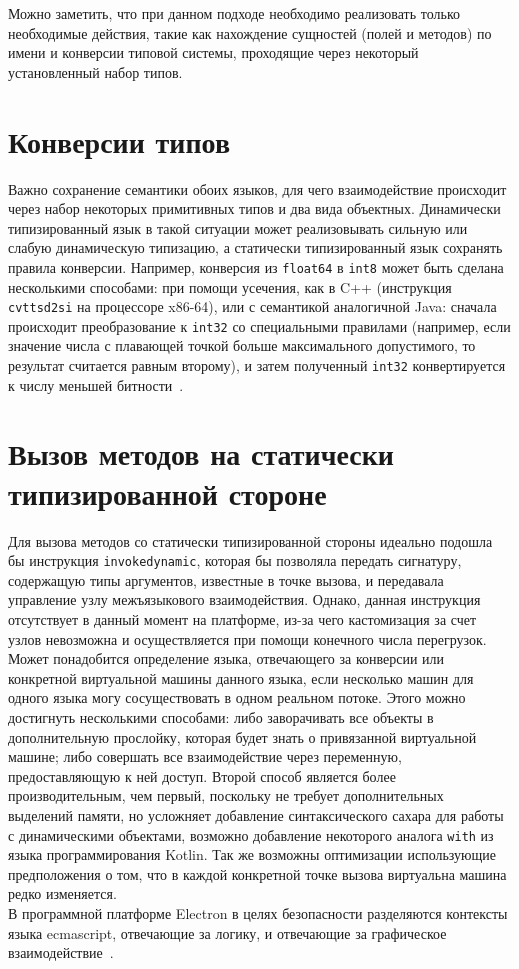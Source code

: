 \documentclass[times,specification,annotation]{itmo-student-thesis}
\begin{document}
Можно заметить, что при данном подходе необходимо реализовать только необходимые действия, такие как нахождение сущностей (полей и методов) по имени и конверсии типовой системы, проходящие через некоторый установленный набор типов.

\section{Конверсии типов}
Важно сохранение семантики обоих языков, для чего взаимодействие происходит через набор некоторых примитивных типов и два вида объектных. Динамически типизированный язык в такой ситуации может реализовывать сильную или слабую динамическую типизацию, а статически типизированный язык сохранять правила конверсии. Например, конверсия из \texttt{float64} в \texttt{int8} может быть сделана несколькими способами: при помощи усечения, как в C++ (инструкция \texttt{cvttsd2si} на процессоре x86-64), или с семантикой аналогичной Java: сначала происходит преобразование к \texttt{int32} со специальными правилами (например, если значение числа с плавающей точкой больше максимального допустимого, то результат считается равным второму), и затем полученный \texttt{int32} конвертируется к числу меньшей битности~\cite{java8-spec}.\\

\section{Вызов методов на статически типизированной стороне}
Для вызова методов со статически типизированной стороны идеально подошла бы инструкция \texttt{invokedynamic}, которая бы позволяла передать сигнатуру, содержащую типы аргументов, известные в точке вызова, и передавала управление узлу межъязыкового взаимодействия. Однако, данная инструкция отсутствует в данный момент на платформе, из-за чего кастомизация за счет узлов невозможна и осуществляется при помощи конечного числа перегрузок.\\
Может понадобится определение языка, отвечающего за конверсии или конкретной виртуальной машины данного языка, если несколько машин для одного языка могу сосуществовать в одном реальном потоке. Этого можно достигнуть несколькими способами: либо заворачивать все объекты в дополнительную прослойку, которая будет знать о привязанной виртуальной машине; либо совершать все взаимодействие через переменную, предоставляющую к ней доступ. Второй способ является более производительным, чем первый, поскольку не требует дополнительных выделений памяти, но усложняет добавление синтаксического сахара для работы с динамическими объектами, возможно добавление некоторого аналога \texttt{with} из языка программирования Kotlin. Так же возможны оптимизации использующие предположения о том, что в каждой конкретной точке вызова виртуальна машина редко изменяется.\\
В программной платформе Electron в целях безопасности разделяются контексты языка ecmascript, отвечающие за логику, и отвечающие за графическое взаимодействие~\cite{electron-isolates}.
\end{document}
